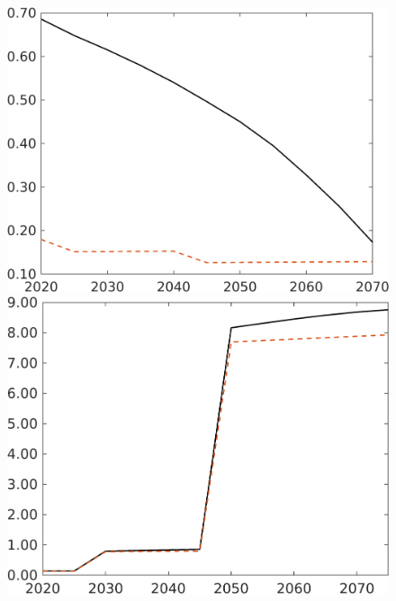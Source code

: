 \begin{figure}[h!!]
	\begin{minipage}[]{0.32\textwidth}
	\includegraphics[width=1\textwidth]{../../codding_model/own_basedOnFried/optimalPol_190722_tidiedUp/figures/all_July22/gAagg_CompEffOPT_T_NoTaus_opteff_spillover0_noskill0_sep1_xgrowth0_countec0_etaa0.79_lgd0_lff0.png}
\end{minipage}
\begin{minipage}[]{0.32\textwidth}
	\includegraphics[width=1\textwidth]{../../codding_model/own_basedOnFried/optimalPol_190722_tidiedUp/figures/all_July22/GFF_CompEffOPT_T_NoTaus_opteff_spillover0_noskill0_sep1_xgrowth0_countec0_etaa0.79_lgd0_lff0.png}

\end{minipage}
\end{figure}
